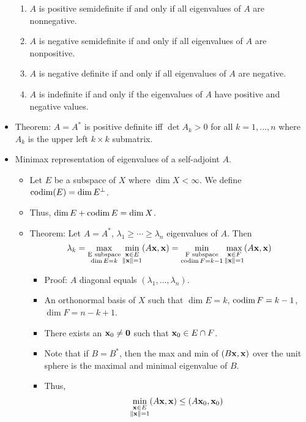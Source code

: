 \documentclass[../../notes.tex]{subfiles}
\begin{document}
\begin{itemize}
\begin{enumerate}
        \item $A$ is positive semidefinite if and only if all eigenvalues of $A$ are nonnegative.
        \item $A$ is negative semidefinite if and only if all eigenvalues of $A$ are nonpositive.
        \item $A$ is negative definite if and only if all eigenvalues of $A$ are negative.
        \item $A$ is indefinite if and only if the eigenvalues of $A$ have positive and negative values.
    \end{enumerate}
    \item Theorem: $A=A^*$ is positive definite iff $\det A_k>0$ for all $k=1,\dots,n$ where $A_k$ is the upper left $k\times k$ submatrix.
    \item Minimax representation of eigenvalues of a self-adjoint $A$.
    \begin{itemize}
        \item Let $E$ be a subspace of $X$ where $\dim X<\infty$. We define $\operatorname{codim}(E)=\dim E^\perp$.
        \item Thus, $\dim E+\operatorname{codim} E=\dim X$.
        \item Theorem: Let $A=A^*$, $\lambda_1\geq\cdots\geq\lambda_n$ eigenvalues of $A$. Then
        \begin{equation*}
            \lambda_k = \max_{\substack{\text{E subspace}\\\dim E=k}}\min_{\substack{\mathbf{x}\in E\\\norm{\mathbf{x}}=1}}(A\mathbf{x},\mathbf{x})
            = \min_{\substack{\text{F subspace}\\\operatorname{codim} F=k-1}}\max_{\substack{\mathbf{x}\in F\\\norm{\mathbf{x}}=1}}(A\mathbf{x},\mathbf{x})
        \end{equation*}
        \begin{itemize}
            \item Proof: $A$ diagonal equals $(\lambda_1,\dots,\lambda_n)$.
            \item An orthonormal basis of $X$ such that $\dim E=k$, $\operatorname{codim} F=k-1$, $\dim F=n-k+1$.
            \item There exists an $\mathbf{x}_0\neq\bm{0}$ such that $\mathbf{x}_0\in E\cap F$.
            \item Note that if $B=B^*$, then the max and min of $(B\mathbf{x},\mathbf{x})$ over the unit sphere is the maximal and minimal eigenvalue of $B$.
            \item Thus,
            \begin{equation*}
                \min_{\substack{\x\in E\\\norm{\x}=1}}(A\x,\x) \leq (A\x_0,\x_0)

\end{equation*}
\end{itemize}
\end{itemize}
\end{itemize}
\end{document}
